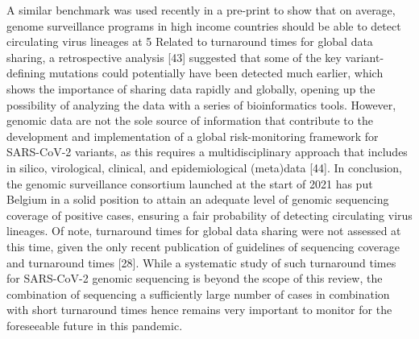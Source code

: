 A similar benchmark was used recently in a pre-print to show that on average, genome surveillance programs in high income countries should be able to detect circulating virus lineages at 5%
Related to turnaround times for global data sharing, a retrospective analysis [43] suggested that some of the key variant-defining mutations could potentially have been detected much earlier, which shows the importance of sharing data rapidly and globally, opening up the possibility of analyzing the data with a series of bioinformatics tools. However, genomic data are not the sole source of information that contribute to the development and implementation of a global risk-monitoring framework for SARS-CoV-2 variants, as this requires a multidisciplinary approach that includes in silico, virological, clinical, and epidemiological (meta)data [44].
In conclusion, the genomic surveillance consortium launched at the start of 2021 has put Belgium in a solid position to attain an adequate level of genomic sequencing coverage of positive cases, ensuring a fair probability of detecting circulating virus lineages. Of note, turnaround times for global data sharing were not assessed at this time, given the only recent publication of guidelines of sequencing coverage and turnaround times [28]. While a systematic study of such turnaround times for SARS-CoV-2 genomic sequencing is beyond the scope of this review, the combination of sequencing a sufficiently large number of cases in combination with short turnaround times hence remains very important to monitor for the foreseeable future in this pandemic.



\cleardoublepage

